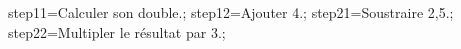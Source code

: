 \documentclass[exercice]{thedocument}%
\begin{document}
%
\>step11=Calculer son double.;%
\>step12=Ajouter 4.;%
\>step21=Soustraire 2,5.;%
\>step22=Multipler le résultat par 3.;%
%
\end{document}
